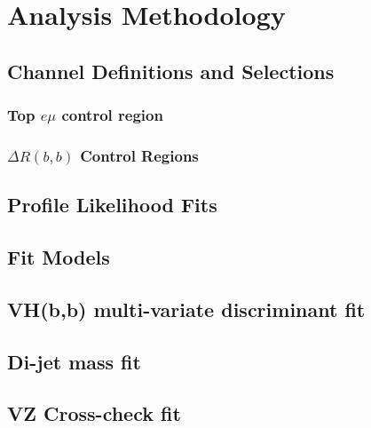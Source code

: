 \chapter{Analysis Methodology}%
\label{sec:method}
\section{Channel Definitions and Selections}%
\label{sec:channels-and-selections}
\subsection{Top \texorpdfstring{$e \mu$}{e mu} control region}%
\label{sec:topemucr}
\subsection{\texorpdfstring{$\Delta R(b,b)$}{DRbb} Control Regions}%
\label{sec:control-region-defintions}
\section{Profile Likelihood Fits}%
\label{sec:plf}
\section{Fit Models}%
\label{sec:fit-models}
\section{VH(b,b) multi-variate discriminant fit}%
\label{sec:mva-fit}
\section{Di-jet mass fit}%
\label{sec:mbb-fit}
\section{VZ Cross-check fit}%
\label{sec:mvadiboson-fit}



